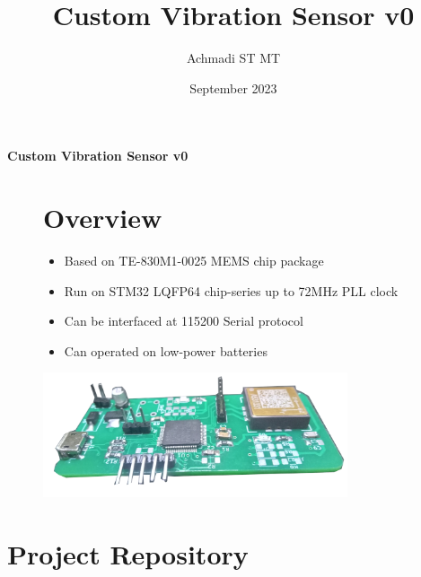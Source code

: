 \documentclass[a4paper,12pt,oneside,pdflatex,italian,final,twocolumn]{article}
\title{Custom Vibration Sensor v0}
\author{Achmadi ST MT}
\date{September 2023}
\begin{document}
	\pagestyle{fancy}
	
	\chead{\today}
	
	\onecolumn
	\begin{figure}
		
	\end{figure}\begin{minipage}{0.47\textwidth}
		\centering
		
	\end{minipage}
	\hfill
	\begin{minipage}{0.47\textwidth}
		\raggedleft
		\Huge \textbf{Custom Vibration Sensor v0}
	\end{minipage}

	\begin{figure}
		\begin{minipage}{0.47\textwidth}
			
			\section{Overview}
			\begin{itemize}
				\item Based on TE-830M1-0025 MEMS chip package
				\item Run on STM32 LQFP64 chip-series up to 72MHz PLL clock
				\item Can be interfaced at 115200 Serial protocol
				\item Can operated on low-power batteries
			\end{itemize}
			
		\end{minipage}
		\hfill
		\begin{minipage}{0.47\textwidth}
			\centering
			\includegraphics[width=0.8\textwidth,right]{images/vibs.png}
		\end{minipage}
	\end{figure}

	\raggedright
	
	\section{Project Repository}
	
\end{document}
